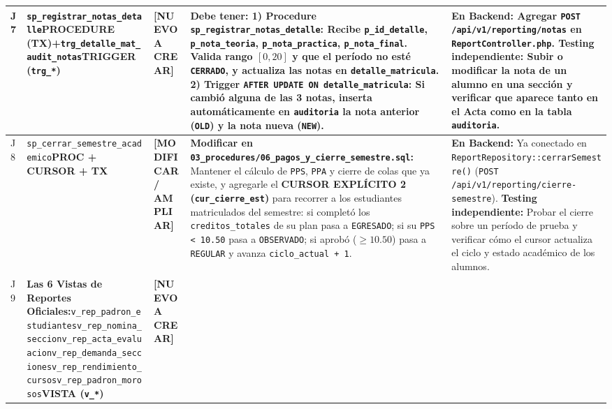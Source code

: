 \documentclass[10pt,a4paper,landscape]{article}
\newcommand{\stModif}{\textbf{\textcolor{orange!85!black}{[MODIFICAR / AMPLIAR]}}}
\newcommand{\stNuevo}{\textbf{\textcolor{red!75!black}{[NUEVO A CREAR]}}}
\newcommand{\objProcTx}{\textbf{\textcolor{unjbgNavy}{PROCEDURE (TX)}}}
\newcommand{\objTrig}{\textbf{\textcolor{orange!80!black}{TRIGGER (\texttt{trg\_*})}}}
\newcommand{\objView}{\textbf{\textcolor{violet!85!black}{VISTA (\texttt{v\_*})}}}
\newcommand{\objCursor}{\textbf{\textcolor{red!75!black}{PROC + CURSOR + TX}}}
\begin{document}
\begin{longtable}{|p{0.5cm}|p{3.8cm}|p{2.9cm}|p{8.8cm}|p{9.2cm}|}
J7 & \texttt{sp\_registrar\_notas\_detalle}\newline \objProcTx\newline +\newline \texttt{trg\_detalle\_mat\_audit\_notas}\newline \objTrig & \stNuevo & 
\textbf{Debe tener:}
1) \textbf{Procedure \texttt{sp\_registrar\_notas\_detalle}:} Recibe \texttt{p\_id\_detalle}, \texttt{p\_nota\_teoria}, \texttt{p\_nota\_practica}, \texttt{p\_nota\_final}. Valida rango $[0, 20]$ y que el período no esté \texttt{CERRADO}, y actualiza las notas en \texttt{detalle\_matricula}.
2) \textbf{Trigger \texttt{AFTER UPDATE ON detalle\_matricula}:} Si cambió alguna de las 3 notas, inserta automáticamente en \texttt{auditoria} la nota anterior (\texttt{OLD}) y la nota nueva (\texttt{NEW}). & 
\textbf{En Backend:} Agregar \texttt{POST /api/v1/reporting/notas} en \texttt{ReportController.php}.\newline
\textbf{Testing independiente:} Subir o modificar la nota de un alumno en una sección y verificar que aparece tanto en el Acta como en la tabla \texttt{auditoria}. \\
\hline
\rowcolor{rowAlt}
J8 & \texttt{sp\_cerrar\_semestre\_academico}\newline \objCursor & \stModif & 
\textbf{Modificar en \texttt{03\_procedures/06\_pagos\_y\_cierre\_semestre.sql}:}
Mantener el cálculo de \texttt{PPS}, \texttt{PPA} y cierre de colas que ya existe, y agregarle el \textbf{CURSOR EXPLÍCITO 2 (\texttt{cur\_cierre\_est})} para recorrer a los estudiantes matriculados del semestre: si completó los \texttt{creditos\_totales} de su plan pasa a \texttt{EGRESADO}; si su \texttt{PPS < 10.50} pasa a \texttt{OBSERVADO}; si aprobó ($\ge 10.50$) pasa a \texttt{REGULAR} y avanza \texttt{ciclo\_actual + 1}. & 
\textbf{En Backend:} Ya conectado en \texttt{ReportRepository::cerrarSemestre()} (\texttt{POST /api/v1/reporting/cierre-semestre}).\newline
\textbf{Testing independiente:} Probar el cierre sobre un período de prueba y verificar cómo el cursor actualiza el ciclo y estado académico de los alumnos. \\
\hline
J9 & \textbf{Las 6 Vistas de Reportes Oficiales:}\newline \texttt{v\_rep\_padron\_estudiantes}\newline \texttt{v\_rep\_nomina\_seccion}\newline \texttt{v\_rep\_acta\_evaluacion}\newline \texttt{v\_rep\_demanda\_secciones}\newline \texttt{v\_rep\_rendimiento\_cursos}\newline \texttt{v\_rep\_padron\_morosos}\newline \objView & \stNuevo & 

\end{longtable}
\end{document}
